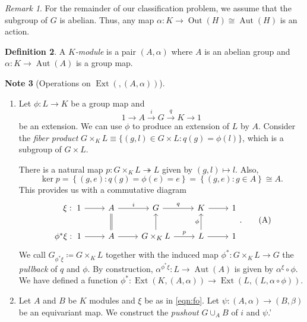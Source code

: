 \documentclass[10pt,letterpaper,cm]{nupset}
\theoremstyle{definition}
\newtheorem{definition}{Definition}[subsection]
\newtheorem{note}[definition]{Note}
\theoremstyle{theorem}
\theoremstyle{remark}
\newtheorem{remark}[definition]{Remark}
\newcommand{\1}{\mathbf{1}}
\newcommand{\0}{\vec 0}
\DeclareMathOperator{\aut}{Aut}
\DeclareMathOperator{\ext}{Ext}
\DeclareMathOperator{\out}{Out}
\begin{document}
\begin{remark}
 For the remainder of our classification problem, we assume that the subgroup of $G$ is abelian. Thus, any map $\alpha : K \to \out(H)\cong \aut(H)$ is an action.
\end{remark}

\begin{definition}
A \textit{$K$-module} is a pair $\left(A, \alpha\right)$ where $A$ is an abelian group and $\alpha : K \to \aut(A)$ is a group map.
\end{definition}

\begin{note}[Operations on $\ext(, (A, \alpha))$] $ $
\begin{enumerate}[label=(\arabic*)]
\item Let $\phi  : L \to K$ be a group map and $$1 \to A \overset{i}{\longrightarrow} G \overset{q}{\longrightarrow} K \to 1$$ be an extension. We can use $\phi$ to produce an extension of $L$ by $A$. Consider the \textit{fiber product} $G \times_K L \equiv \{(g, l) \in G \times L : q(g) = \phi(l)\}$, which is a subgroup of $G \times L$.

There is a natural map $p: G\times_K L \twoheadrightarrow L$ given by $\left(g, l\right) \mapsto l$. Also, $$\ker{p} = \left\{(g, e) : q(g) = \phi(e) =e \right\} = \left\{(g, e) : g \in A\right\} \cong A.$$ This provides us with a commutative diagram
\[ \label{eqn:fo}
\begin{tikzcd}
\quad \xi:\ 1 \arrow[r] & A \arrow[r, "i"] & G \arrow[r, "q"] & K \arrow[r] & 1 \\
\phi^{\ast}\xi :\ 1 \arrow[r] & A \arrow[r] \arrow[u, equal] & G\times_K L \arrow[r, "p"] \arrow[u] & L \arrow[u, "\phi"] \arrow[r] & 1
\end{tikzcd}. \tag{A}
\]
We call $G_{\phi^{\ast}\xi}\coloneqq  G\times_{K}L$ together with the induced map $\phi^{\ast} : G\times_{K}L\to G$ the \textit{pullback} of $q$ and $\phi$.  By construction, $\alpha^{\phi^{\ast}\xi} : L \to \aut(A)$ is given by $\alpha^{\xi} \circ \phi$. We have defined a function $\phi^{\ast} : \ext(K, (A, \alpha)) \to \ext(L, (L, \alpha \circ \phi))$. 

\item Let $A$ and $B$ be $K$ modules and $\xi$ be as in \eqref{eqn:fo}. Let $\psi: (A, \alpha) \to (B, \beta)$ be an equivariant map. We construct the \textit{pushout} $G \cup_A B$ of $i$ and $\psi$.'


\end{enumerate}
\end{note}
\end{document}
